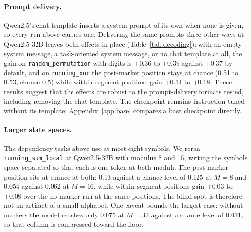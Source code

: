 \documentclass[10pt]{article} %
\newcommand{\task}[1]{\texttt{#1}}
\begin{document}
\begin{table}[!htbp]
\centering
\small
\caption{Periodic against jittered marker placement on the dependency tasks ($N \le 64$, $k \in \{4, 8\}$, same inputs; index scoring). Pooled $\Delta$ is against the length-matched no-marker mean; post-marker and within-segment changes are against the no-marker run at the same positions.}
\label{tab:jitterdep}

\end{table}

\FloatBarrier
\label{app:delimiter}

\paragraph{Prompt delivery.} Qwen2.5's chat template inserts a system prompt of its own when none is given, so every run above carries one. Delivering the same prompts three other ways at Qwen2.5-32B leaves both effects in place (Table~\ref{tab:decoding}): with an empty system message, a task-oriented system message, or no chat template at all, the gain on \task{random\_permutation} with digits is $+0.36$ to $+0.39$ against $+0.37$ by default, and on \task{running\_xor} the post-marker position stays at chance (0.51 to 0.53, chance 0.5) while within-segment positions gain $+0.14$ to $+0.18$. These results suggest that the effects are robust to the prompt-delivery formats tested, including removing the chat template. The checkpoint remains instruction-tuned without its template; Appendix~\ref{app:base} compares a base checkpoint directly.

\paragraph{Larger state spaces.} The dependency tasks above use at most eight symbols. We reran \task{running\_sum\_local} at Qwen2.5-32B with modulus 8 and 16, writing the symbols space-separated so that each is one token at both moduli. The post-marker position sits at chance at both: 0.13 against a chance level of 0.125 at $M = 8$ and 0.054 against 0.062 at $M = 16$, while within-segment positions gain $+0.03$ to $+0.08$ over the no-marker run at the same positions. The blind spot is therefore not an artifact of a small alphabet. One caveat bounds the largest case: without markers the model reaches only 0.075 at $M = 32$ against a chance level of 0.031, so that column is compressed toward the floor.
\end{document}
